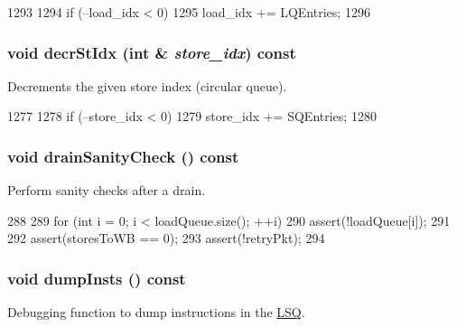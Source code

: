 \begin{DoxyCode}
1293 {
1294     if (--load_idx < 0)
1295         load_idx += LQEntries;
1296 }
\end{DoxyCode}
\hypertarget{classLSQUnit_a4ebe3751617bcb686e225184f77f971c}{
\subsubsection[{decrStIdx}]{\setlength{\rightskip}{0pt plus 5cm}void decrStIdx (int \& {\em store\_\-idx}) const}}
\label{classLSQUnit_a4ebe3751617bcb686e225184f77f971c}
Decrements the given store index (circular queue). 


\begin{DoxyCode}
1277 {
1278     if (--store_idx < 0)
1279         store_idx += SQEntries;
1280 }
\end{DoxyCode}
\hypertarget{classLSQUnit_a0240eb42fa57fe5d3788093f62b77347}{
\subsubsection[{drainSanityCheck}]{\setlength{\rightskip}{0pt plus 5cm}void drainSanityCheck () const}}
\label{classLSQUnit_a0240eb42fa57fe5d3788093f62b77347}
Perform sanity checks after a drain. 


\begin{DoxyCode}
288 {
289     for (int i = 0; i < loadQueue.size(); ++i)
290         assert(!loadQueue[i]);
291 
292     assert(storesToWB == 0);
293     assert(!retryPkt);
294 }
\end{DoxyCode}
\hypertarget{classLSQUnit_ad0dcc54f6823ec37a9ab4eef289e2305}{
\subsubsection[{dumpInsts}]{\setlength{\rightskip}{0pt plus 5cm}void dumpInsts () const}}
\label{classLSQUnit_ad0dcc54f6823ec37a9ab4eef289e2305}
Debugging function to dump instructions in the \hyperlink{classLSQ}{LSQ}. 


